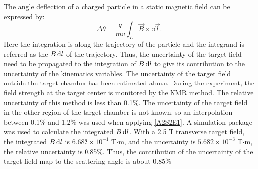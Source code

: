 The angle deflection of a charged particle in a static magnetic field can be expressed by:
\begin{equation} \label{A2S2E1}
\Delta\theta=\frac{q}{mv}\int_{L}\vec{B}\times\dd{\vec{l}}.
\end{equation}
Here the integration is along the trajectory of the particle and the integrand is referred as the $B\dd{l}$ of the trajectory. Thus, the uncertainty of the target field need to be propagated to the integration of $B\dd{l}$ to give its contribution to the uncertainty of the kinematics variables. The uncertainty of the target field outside the target chamber has been estimated above. During the experiment, the field strength at the target center is monitored by the NMR method. The relative uncertainty of this method is less than 0.1\%. The uncertainty of the target field in the other region of the target chamber is not known, so an interpolation between 0.1\% and 1.2\% was used when applying \cref{A2S2E1}. A simulation package was used to calculate the integrated $B\dd{l}$. With a 2.5 T transverse target field, the integrated $B\dd{l}$ is $6.682\times 10^{-1}$ T$\cdot$m, and the uncertainty is $5.682\times 10^{-3}$ T$\cdot$m, the relative uncertainty is 0.85\%. Thus, the contribution of the uncertainty of the target field map to the scattering angle is about 0.85\%.

\newpage
\cleardoublepage

